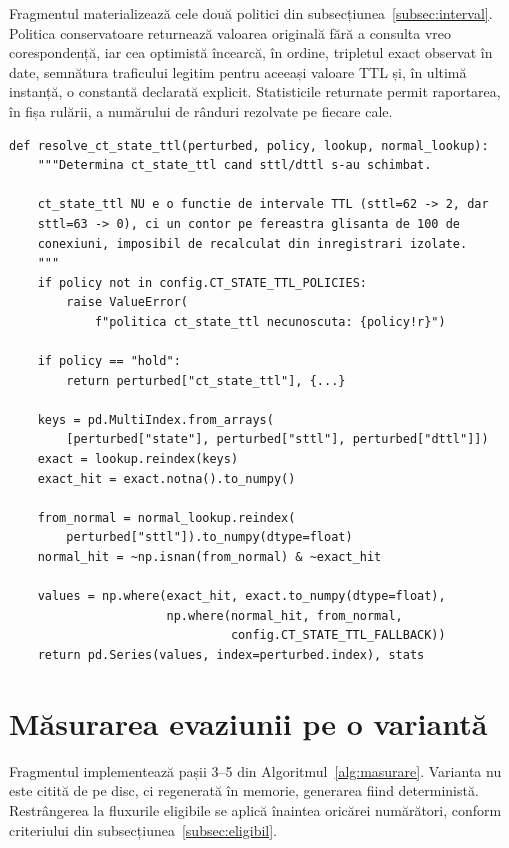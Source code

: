 Fragmentul materializează cele două politici din subsecțiunea~\ref{subsec:interval}. Politica conservatoare returnează valoarea originală fără a consulta vreo corespondență, iar cea optimistă încearcă, în ordine, tripletul exact observat în date, semnătura traficului legitim pentru aceeași valoare TTL și, în ultimă instanță, o constantă declarată explicit. Statisticile returnate permit raportarea, în fișa rulării, a numărului de rânduri rezolvate pe fiecare cale.

\begin{verbatim}
def resolve_ct_state_ttl(perturbed, policy, lookup, normal_lookup):
    """Determina ct_state_ttl cand sttl/dttl s-au schimbat.

    ct_state_ttl NU e o functie de intervale TTL (sttl=62 -> 2, dar
    sttl=63 -> 0), ci un contor pe fereastra glisanta de 100 de
    conexiuni, imposibil de recalculat din inregistrari izolate.
    """
    if policy not in config.CT_STATE_TTL_POLICIES:
        raise ValueError(
            f"politica ct_state_ttl necunoscuta: {policy!r}")

    if policy == "hold":
        return perturbed["ct_state_ttl"], {...}

    keys = pd.MultiIndex.from_arrays(
        [perturbed["state"], perturbed["sttl"], perturbed["dttl"]])
    exact = lookup.reindex(keys)
    exact_hit = exact.notna().to_numpy()

    from_normal = normal_lookup.reindex(
        perturbed["sttl"]).to_numpy(dtype=float)
    normal_hit = ~np.isnan(from_normal) & ~exact_hit

    values = np.where(exact_hit, exact.to_numpy(dtype=float),
                      np.where(normal_hit, from_normal,
                               config.CT_STATE_TTL_FALLBACK))
    return pd.Series(values, index=perturbed.index), stats
\end{verbatim}

\section{Măsurarea evaziunii pe o variantă}\label{sec:anexa-masurare}

Fragmentul implementează pașii 3--5 din Algoritmul~\ref{alg:masurare}. Varianta nu este citită de pe disc, ci regenerată în memorie, generarea fiind deterministă. Restrângerea la fluxurile eligibile se aplică înaintea oricărei numărători, conform criteriului din subsecțiunea~\ref{subsec:eligibil}.

